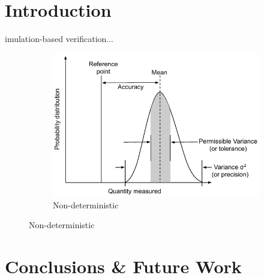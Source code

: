 \documentclass[letterpaper, 10 pt, journal, twoside]{IEEEtran}
\begin{document}
\section{Introduction} \label{s:introduction}

imulation-based verification...

\begin{figure}[!b]
    \centering
    \begin{subfigure}{.48\textwidth}
        \includegraphics[width=1\textwidth]{Figures/Variance_predicition_tolerance_definition_diagram_a.pdf}
        \caption{Non-deterministic}
        \label{variance_description_a}
    \end{subfigure}
\end{figure}



\section{Conclusions \& Future Work}\label{s:conclusion}



\printbibliography
\end{document}
